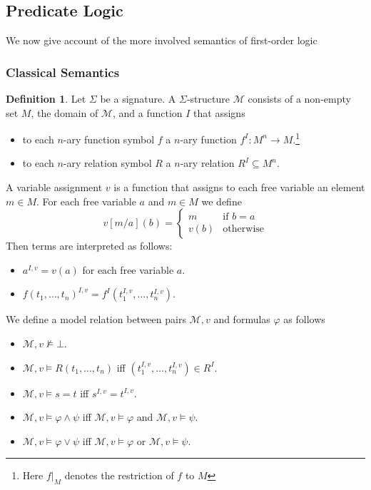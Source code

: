 \documentclass[a4paper,11pt]{report}
\theoremstyle{definition}
\theoremstyle{definition}
\theoremstyle{definition}
\theoremstyle{definition}
\theoremstyle{definition}
\newtheorem{definition}[theorem]{Definition}
\theoremstyle{definition}
\theoremstyle{definition}
\begin{document}
	
	\subsection{Predicate Logic}

	We now give account of the more involved semantics of first-order logic
	
	\subsubsection{Classical Semantics}

	\begin{definition}
		Let $\Sigma$ be a signature. A $\Sigma$-structure $\mathcal{M}$ consists of a non-empty set $M$, the domain of $\mathcal{M}$, and a function $I$ that assigns
		\begin{itemize}
			\item to each $n$-ary function symbol $f$ a $n$-ary function $f^I: M^n\to M$.\footnote{Here $f|_M$ denotes the restriction of $f$ to $M$}
			\item to each $n$-ary relation symbol $R$ a $n$-ary relation $R^I\subseteq M^n$.
		\end{itemize}
		A variable assignment $v$ is a function that assigns to each free variable an element $m\in M$. For each free variable $a$ and $m\in M$ we define $$v[m/a](b) = \begin{cases}
			m&\text{if $b=a$}\\
			v(b)&\text{otherwise}
		\end{cases}$$
		Then terms are interpreted as follows:
		\begin{itemize}
			\item $a^{I, v} = v(a)$ for each free variable $a$.
			\item $f(t_1,\dots,t_n)^{I, v} = f^I(t_1^{I, v},\dots, t_n^{I, v})$.
		\end{itemize}
		We define a model relation between pairs $\mathcal M, v$ and formulas $\varphi$ as follows
		\begin{itemize}
			\item $\mathcal M, v\not\models\bot$.
			\item $\mathcal M, v\models R(t_1,\dots,t_n)$ iff $(t_1^{I, v},\dots,t_n^{I, v})\in R^I$.
			\item $\mathcal M, v\models s = t$ iff $s^{I, v} = t^{I, v}$.
			\item $\mathcal M, v\models \varphi\wedge \psi$ iff $\mathcal M, v\models\varphi$ and $\mathcal M, v\models\psi$.
			\item $\mathcal M, v\models \varphi\vee\psi$ iff $\mathcal M, v\models\varphi$ or $\mathcal M, v\models\psi$.

\end{itemize}
\end{definition}
\end{document}
